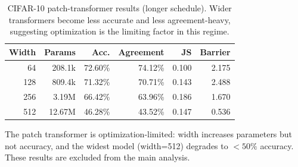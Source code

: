 \documentclass[11pt]{article}
\begin{document}
\begin{table}[ht]
\centering
\small
\begin{tabular}{rrrrrr}
\toprule
Width & Params & Acc. & Agreement & JS & Barrier \\
\midrule
64  & 208.1k & 72.60\% & 74.12\% & 0.100 & 2.175 \\
128 & 809.4k & 71.32\% & 70.71\% & 0.143 & 2.488 \\
256 & 3.19M  & 66.42\% & 63.96\% & 0.186 & 1.670 \\
512 & 12.67M & 46.28\% & 43.52\% & 0.147 & 0.536 \\
\bottomrule
\end{tabular}
\caption{CIFAR-10 patch-transformer results (longer schedule).  Wider
transformers become less accurate and less agreement-heavy, suggesting
optimization is the limiting factor in this regime.}
\label{tab:transformer}
\end{table}

The patch transformer is optimization-limited: width increases parameters
but not accuracy, and the widest model (width=512) degrades to $<50\%$
accuracy.  These results are excluded from the main analysis.
\end{document}
